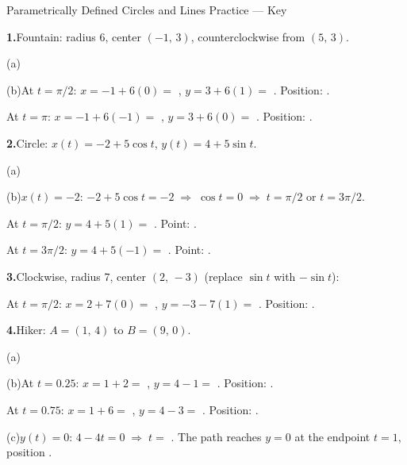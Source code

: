 \documentclass[10pt]{article}
\begin{document}
\namedateperiod

\vspace{0.10in}

\begin{notesbox}{Parametrically Defined Circles and Lines Practice --- Key}

\textbf{1.}\quad Fountain: radius 6, center $(-1,\,3)$, counterclockwise from $(5,\,3)$.

\vspace{4pt}
(a)\quad {}

(b)\quad At $t = \pi/2$: $x = -1 + 6(0) = $ , $y = 3 + 6(1) = $ . Position: .

At $t = \pi$: $x = -1 + 6(-1) = $ , $y = 3 + 6(0) = $ . Position: .

\vspace{0.08in}
\textbf{2.}\quad Circle: $x(t) = -2 + 5\cos t$, $y(t) = 4 + 5\sin t$.

(a)\quad {}

(b)\quad $x(t) = -2$: $-2 + 5\cos t = -2 \;\Rightarrow\; \cos t = 0 \;\Rightarrow\; t = \pi/2$ or $t = 3\pi/2$.

At $t=\pi/2$: $y = 4+5(1) = $ . Point: .

At $t=3\pi/2$: $y = 4+5(-1) = $ . Point: .

\vspace{0.08in}
\textbf{3.}\quad Clockwise, radius 7, center $(2,\,-3)$ (replace $\sin t$ with $-\sin t$):


At $t = \pi/2$: $x = 2 + 7(0) = $ , $y = -3 - 7(1) = $ . Position: .

\vspace{0.08in}
\textbf{4.}\quad Hiker: $A = (1,\,4)$ to $B = (9,\,0)$.

(a)\quad {}

(b)\quad At $t = 0.25$: $x = 1 + 2 = $ , $y = 4 - 1 = $ . Position: .

At $t = 0.75$: $x = 1 + 6 = $ , $y = 4 - 3 = $ . Position: .

(c)\quad $y(t) = 0$: $4 - 4t = 0 \;\Rightarrow\; t = $ . The path reaches $y=0$ at the endpoint $t=1$, position .

\end{notesbox}
\end{document}
